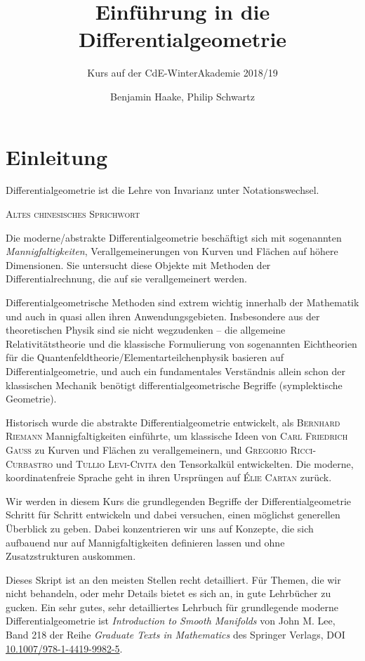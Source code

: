 \documentclass[a4paper]{scrbook}
\title{Einführung in die Differentialgeometrie}
\subtitle{Kurs auf der CdE-WinterAkademie 2018/19}
\author{Benjamin Haake, Philip Schwartz}
\date{}
\numberwithin{equation}{chapter}
\theoremstyle{definition}
\begin{document}
\maketitle
\tableofcontents

\setcounter{chapter}{-1}
\chapter{Einleitung}
\epigraph{Differentialgeometrie ist die Lehre von Invarianz unter Notationswechsel.}{\textsc{Altes chinesisches Sprichwort}}

Die moderne/abstrakte Differentialgeometrie beschäftigt sich mit sogenannten \emph{Mannigfaltigkeiten}, Verallgemeinerungen von Kurven und Flächen auf höhere Dimensionen. Sie untersucht diese Objekte mit Methoden der Differentialrechnung, die auf sie verallgemeinert werden.

Differentialgeometrische Methoden sind extrem wichtig innerhalb der Mathematik und auch in quasi allen ihren Anwendungsgebieten. Insbesondere aus der theoretischen Physik sind sie nicht wegzudenken -- die allgemeine Relativitätstheorie und die klassische Formulierung von sogenannten Eichtheorien für die Quantenfeldtheorie/Elementarteilchenphysik basieren auf Differentialgeometrie, und auch ein fundamentales Verständnis allein schon der klassischen Mechanik benötigt differentialgeometrische Begriffe (symplektische Geometrie).

Historisch wurde die abstrakte Differentialgeometrie entwickelt, als \textsc{Bernhard Riemann} Mannigfaltigkeiten einführte, um klassische Ideen von \textsc{Carl Friedrich Gauß} zu Kurven und Flächen zu verallgemeinern, und \textsc{Gregorio Ricci-Curbastro} und \textsc{Tullio Levi-Civita} den Tensorkalkül entwickelten. Die moderne, koordinatenfreie Sprache geht in ihren Ursprüngen auf \textsc{Élie Cartan} zurück.

Wir werden in diesem Kurs die grundlegenden Begriffe der Differentialgeometrie Schritt für Schritt entwickeln und dabei versuchen, einen möglichst generellen Überblick zu geben. Dabei konzentrieren wir uns auf Konzepte, die sich aufbauend nur auf Mannigfaltigkeiten definieren lassen und ohne Zusatzstrukturen auskommen.

Dieses Skript ist an den meisten Stellen recht detailliert. Für Themen, die wir nicht behandeln, oder mehr Details bietet es sich an, in gute Lehrbücher zu gucken. Ein sehr gutes, sehr detailliertes Lehrbuch für grundlegende moderne Differentialgeometrie ist \emph{Introduction to	Smooth Manifolds} von John M. Lee, Band 218 der Reihe \emph{Graduate Texts in Mathematics} des Springer Verlags, DOI \href{https://doi.org/10.1007/978-1-4419-9982-5}{10.1007/978-1-4419-9982-5}.
\end{document}
